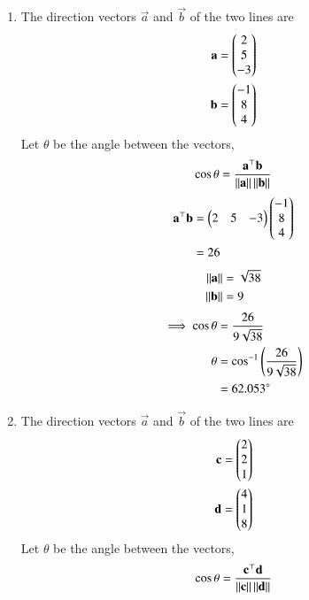 \begin{enumerate}
    \item 
    The direction vectors $\vec{a}$ and $\vec{b}$ of the two lines are
    \begin{align}
        \mathbf{a}=\begin{pmatrix}2\\5\\-3\end{pmatrix}\\
        \mathbf{b}=\begin{pmatrix}-1\\8\\4\end{pmatrix}
    \end{align}
    Let $\theta$ be the angle between the vectors,
    \begin{align}
        \cos\theta = \frac{\mathbf{a}^\top \mathbf{b}}{\left\lVert\mathbf{a}\right\rVert {\left\lVert\mathbf{b}\right\rVert}}
    \end{align}
    \begin{align}
        \mathbf{a}^\top\mathbf{b}&=\begin{pmatrix}2&5&-3\end{pmatrix}\begin{pmatrix}-1\\8\\4\end{pmatrix}\\
                           &=26
    \end{align}
    \begin{align}
        \left\lVert\mathbf{a}\right\rVert &=\sqrt{38}\\
        \left\lVert\mathbf{b}\right\rVert &=9
    \end{align}
    \begin{align}
        \implies \cos\theta & = \frac{26}{9\sqrt{38}}\\
          \theta &= \cos^{-1}\left(\frac{26}{9\sqrt{38}}\right)\\
                 &= 62.053\degree
    \end{align}
    \item 
    The direction vectors $\vec{a}$ and $\vec{b}$ of the two lines are
    \begin{align}
        \mathbf{c}=\begin{pmatrix}2\\2\\1\end{pmatrix}\\
        \mathbf{d}=\begin{pmatrix}4\\1\\8\end{pmatrix}
    \end{align}
    Let $\theta$ be the angle between the vectors,
    \begin{align}
        \cos\theta = \frac{\vec{c}^\top \vec{d}}{\norm{\vec{c}} {\norm{\vec{d}}}}

\end{align}
\end{enumerate}
